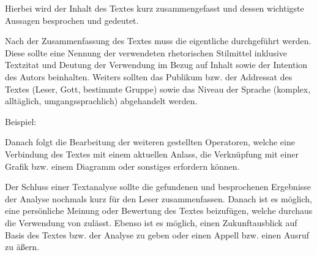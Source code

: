 \begin{enumerate}
\begin{enumerate}
			Hierbei wird der Inhalt des Textes kurz zusammengefasst und dessen wichtigste Aussagen besprochen und gedeutet.


			Nach der Zusammenfassung des Textes muss die eigentliche  durchgef\"{u}hrt werden. Diese sollte eine Nennung der verwendeten rhetorischen Stilmittel inklusive Textzitat und Deutung der Verwendung im Bezug auf Inhalt sowie der Intention des Autors beinhalten. Weiters sollten das Publikum bzw. der Addressat des Textes (Leser, Gott, bestimmte Gruppe) sowie das Niveau der Sprache (komplex, allt\"{a}glich, umgangssprachlich) abgehandelt werden. 

			\extrapar

			Beispiel:

			\extrapar



			Danach folgt die Bearbeitung der weiteren gestellten Operatoren, welche eine Verbindung des Textes mit einem aktuellen Anlass, die Verkn\"{u}pfung mit einer Grafik bzw. einem Diagramm oder sonstiges erfordern k\"{o}nnen.

		\end{enumerate}


	Der Schluss einer Textanalyse sollte die gefundenen und besprochenen Ergebnisse der Analyse nochmals kurz f\"{u}r den Leser zusammenfassen. Danach ist es m\"{o}glich, eine pers\"{o}nliche Meinung oder Bewertung des Textes beizuf\"{u}gen, welche durchaus die Verwendung von  zul\"{a}sst. Ebenso ist es m\"{o}glich, einen Zukunftausblick auf Basis des Textes bzw. der Analyse zu geben oder einen Appell bzw. einen Ausruf zu \"{a}\ss{}ern.

\end{enumerate}

